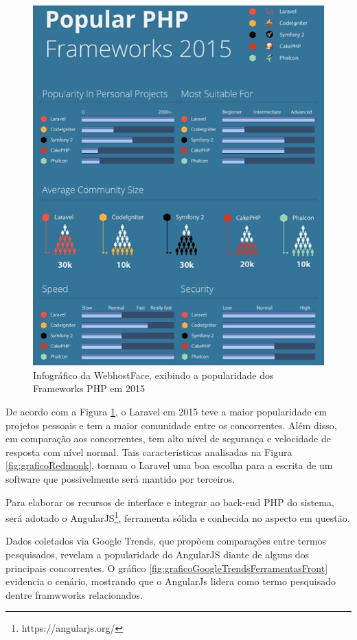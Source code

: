 \begin{figure}
	\includegraphics[width=1\textwidth]{images/infografico_webhostface}
	\caption{Infográfico da WebhostFace, exibindo a popularidade dos Frameworks PHP em 2015}
    \label{fig:graficoWebhostface}
\end{figure}


De acordo com a Figura \ref{fig:graficoWebhostface}, o Laravel em 2015 teve a maior popularidade em projetos pessoais e tem a maior comunidade entre os concorrentes. Além disso, em comparação aos concorrentes, tem alto nível de segurança e velocidade de resposta com nível normal. Tais características analisadas na Figura \ref{fig:graficoRedmonk}, tornam o Laravel uma boa escolha para a escrita de um software que possivelmente será mantido por terceiros.


Para elaborar os recursos de interface e integrar ao back-end PHP do sistema, será adotado o AngularJS\footnote{https://angularjs.org/}, ferramenta sólida e conhecida no aspecto em questão. 


Dados coletados via Google Trends, que propõem comparações entre termos pesquisados, revelam a popularidade do AngularJS diante de alguns dos principais concorrentes. O gráfico \ref{fig:graficoGoogleTrendsFerramentasFront} evidencia o cenário, mostrando que o AngularJs lidera como termo pesquisado dentre framwworks relacionados.


